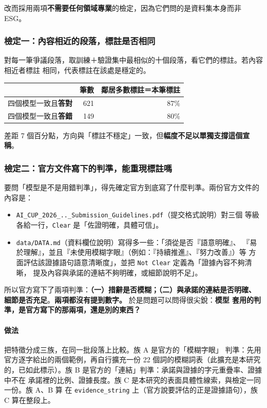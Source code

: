 \documentclass[11pt,a4paper]{ctexart}
\newcommand{\fn}[1]{\texttt{#1}}
\begin{document}
改而採用兩項\textbf{不需要任何領域專業}的檢定，因為它們問的是資料集本身而非 ESG。

\subsubsection{檢定一：內容相近的段落，標註是否相同}

對每一筆爭議段落，取訓練＋驗證集中最相似的十個段落，看它們的標註。若內容相近者標註
相同，代表標註在該處是穩定的。

\begin{table}[h]
\centering\small
\begin{tabular}{@{}lrr@{}}
\toprule
 & 筆數 & 鄰居多數標註＝本筆標註 \\
\midrule
四個模型一致且\textbf{答對} & 621 & 87\% \\
四個模型一致且\textbf{答錯} & 149 & 80\% \\
\bottomrule
\end{tabular}
\end{table}

差距 7 個百分點，方向與「標註不穩定」一致，但\textbf{幅度不足以單獨支撐這個宣稱}。

\subsubsection{檢定二：官方文件寫下的判準，能重現標註嗎}

要問「模型是不是用錯判準」，得先確定官方到底寫了什麼判準。兩份官方文件的內容是：

\begin{itemize}[leftmargin=2em, itemsep=2pt]
  \item \texttt{AI\_CUP\_2026\_..\_Submission\_Guidelines.pdf}（提交格式說明）對三個
        等級各給一行，\fn{Clear} 是「佐證明確，具體可信」。
  \item \texttt{data/DATA.md}（資料欄位說明）寫得多一些：「須從是否『語意明確』、
        『易於理解』，並且『未使用模糊字眼』（例如：『持續推進』、『努力改善』）等
        方面評估該證據語句語意清晰度」，並把 \fn{Not Clear} 定義為「證據內容不夠清晰，
        提及內容與承諾的連結不夠明確，或細節說明不足」。
\end{itemize}

所以官方寫下了兩項判準：\textbf{（一）措辭是否模糊；（二）與承諾的連結是否明確、
細節是否充足}。\textbf{兩項都沒有提到數字。} 於是問題可以問得很尖銳：\textbf{模型
套用的判準，是官方寫下的那兩項，還是別的東西？}

\paragraph{做法} 把特徵分成三族，在同一批段落上比較。族 A 是官方的「模糊字眼」
判準：先用官方逐字給出的兩個範例，再自行擴充一份 22 個詞的模糊詞表（此擴充是本研究
的，已如此標示）。族 B 是官方的「連結」判準：承諾與證據的字元重疊率、證據中不在
承諾裡的比例、證據長度。族 C 是本研究的表面具體性線索，與檢定一同一份。族 A、B 算
在 \fn{evidence\_string} 上（官方說要評估的正是證據語句），族 C 算在整段上。
\end{document}
